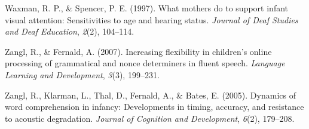 \documentclass[12pt,]{article}
\begin{document}
Waxman, R. P., \& Spencer, P. E. (1997). What mothers do to support
infant visual attention: Sensitivities to age and hearing status.
\emph{Journal of Deaf Studies and Deaf Education}, \emph{2}(2),
104--114.

Zangl, R., \& Fernald, A. (2007). Increasing flexibility in children's
online processing of grammatical and nonce determiners in fluent speech.
\emph{Language Learning and Development}, \emph{3}(3), 199--231.

Zangl, R., Klarman, L., Thal, D., Fernald, A., \& Bates, E. (2005).
Dynamics of word comprehension in infancy: Developments in timing,
accuracy, and resistance to acoustic degradation. \emph{Journal of
Cognition and Development}, \emph{6}(2), 179--208.
\end{document}
